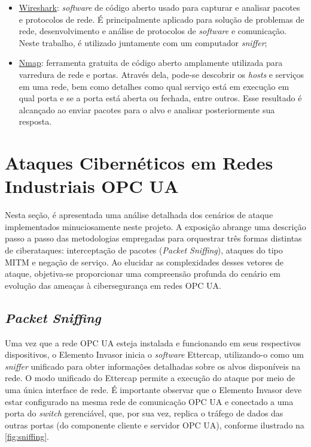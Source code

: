 \begin{itemize}
            \item \underline{Wireshark}: \textit{software} de código aberto usado para capturar e analisar pacotes e protocolos de rede. É principalmente aplicado para solução de problemas de rede, desenvolvimento e análise de protocolos de \textit{software} e comunicação. Neste trabalho, é utilizado juntamente com um computador \textit{sniffer};
            \item \underline{Nmap}: ferramenta gratuita de código aberto amplamente utilizada para varredura de rede e portas. Através dela, pode-se descobrir os \textit{hosts} e serviços em uma rede, bem como detalhes como qual serviço está em execução em qual porta e se a porta está aberta ou fechada, entre outros. Esse resultado é alcançado ao enviar pacotes para o alvo e analisar posteriormente sua resposta.
        \end{itemize}

\section{Ataques Cibernéticos em Redes Industriais OPC UA} \label{sec:attacks}

    Nesta seção, é apresentada uma análise detalhada dos cenários de ataque implementados minuciosamente neste projeto. A exposição abrange uma descrição passo a passo das metodologias empregadas para orquestrar três formas distintas de ciberataques: interceptação de pacotes (\textit{Packet Sniffing}), ataques do tipo MITM e negação de serviço. Ao elucidar as complexidades desses vetores de ataque, objetiva-se proporcionar uma compreensão profunda do cenário em evolução das ameaças à cibersegurança em redes OPC UA.

    \subsection{\textit{Packet Sniffing}}

        Uma vez que a rede OPC UA esteja instalada e funcionando em seus respectivos dispositivos, o Elemento Invasor inicia o \textit{software} Ettercap, utilizando-o como um \textit{sniffer} unificado para obter informações detalhadas sobre os alvos disponíveis na rede. O modo unificado do Ettercap permite a execução do ataque por meio de uma única interface de rede. É importante observar que o Elemento Invasor deve estar configurado na mesma rede de comunicação OPC UA e conectado a uma porta do \textit{switch} gerenciável, que, por sua vez, replica o tráfego de dados das outras portas (do componente cliente e servidor OPC UA), conforme ilustrado na \autoref{fig:sniffing}.

